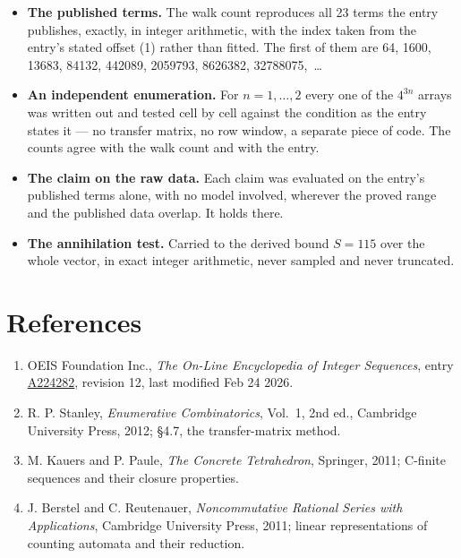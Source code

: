\documentclass[11pt]{article}
\theoremstyle{definition}
\begin{document}
\begin{itemize}

\item {\bfseries The published terms.} The walk count reproduces all 23 terms the entry publishes, exactly, in integer arithmetic, with the index taken from the entry's stated offset (1) rather than fitted. The first of them are 64, 1600, 13683, 84132, 442089, 2059793, 8626382, 32788075,~\dots

\item {\bfseries An independent enumeration.} For $n = 1,\dots,2$ every one of the $4^{3n}$ arrays was written out and tested cell by cell against the condition as the entry states it --- no transfer matrix, no row window, a separate piece of code. The counts agree with the walk count and with the entry.

\item {\bfseries The claim on the raw data.} Each claim was evaluated on the entry's published terms alone, with no model involved, wherever the proved range and the published data overlap. It holds there.

\item {\bfseries The annihilation test.} Carried to the derived bound $S = 115$ over the whole vector, in exact integer arithmetic, never sampled and never truncated.

\end{itemize}

\section{References}

\begin{enumerate}

\item OEIS Foundation Inc., \emph{The On-Line Encyclopedia of Integer Sequences}, entry \href{https://oeis.org/A224282}{A224282}, revision 12, last modified Feb 24 2026.

\item R. P. Stanley, \emph{Enumerative Combinatorics}, Vol.~1, 2nd ed., Cambridge University Press, 2012; \S4.7, the transfer-matrix method.

\item M. Kauers and P. Paule, \emph{The Concrete Tetrahedron}, Springer, 2011; C-finite sequences and their closure properties.

\item J. Berstel and C. Reutenauer, \emph{Noncommutative Rational Series with Applications}, Cambridge University Press, 2011; linear representations of counting automata and their reduction.

\end{enumerate}
\end{document}
